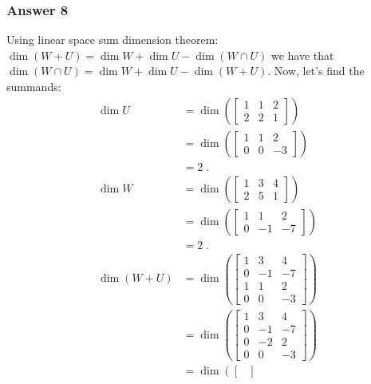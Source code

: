 \documentclass[11pt]{article}
\begin{document}
\subsubsection{Answer 8}
\label{sec-1-6-1}
Using linear space sum dimension theorem: $\dim(W + U) = \dim W + \dim U -
    \dim(W \cap U)$ we have that $\dim(W \cap U) = \dim W + \dim U - \dim(W +
    U)$.
Now, let's find the summands:
\begin{align*}
  \dim{U} &= \dim \left(\begin{bmatrix}
           1 & 1 & 2 \\
           2 & 2 & 1
         \end{bmatrix} \right) \\
          &= \dim \left(\begin{bmatrix}
           1 & 1 & 2 \\
           0 & 0 & -3
         \end{bmatrix} \right) \\
          &= 2\;. \\
  \dim{W} &= \dim \left(\begin{bmatrix}
           1 & 3 & 4 \\
           2 & 5 & 1
         \end{bmatrix} \right) \\
          &= \dim \left(\begin{bmatrix}
           1 & 1  & 2 \\
           0 & -1 & -7
         \end{bmatrix} \right) \\
          &= 2\;. \\
  \dim(W + U) &= \dim \left(\begin{bmatrix}
           1 & 3  & 4 \\
           0 & -1 & -7 \\
           1 & 1  & 2 \\
           0 & 0  & -3
         \end{bmatrix} \right) \\
          &= \dim \left(\begin{bmatrix}
           1 & 3  & 4 \\
           0 & -1 & -7 \\
           0 & -2 & 2 \\
           0 & 0  & -3
         \end{bmatrix} \right) \\
          &= \dim \left(\begin{bmatrix}

\end{bmatrix}
\end{align*}
\end{document}
